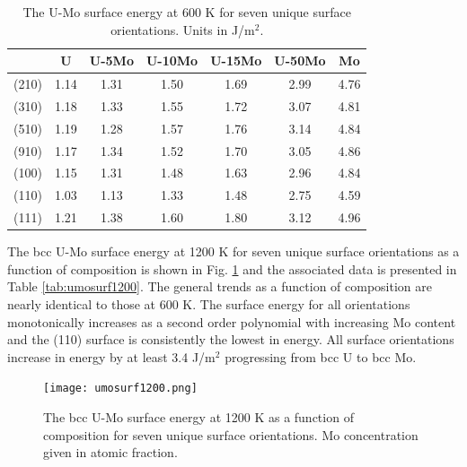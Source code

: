 \documentclass[review]{elsarticle}
\begin{document}
\begin{table}[h]
\caption{The U-Mo surface energy at 600 K for seven unique surface orientations. Units in J/m$^{2}$. } \label{tab:umosurf600}
\begin{center}
\begin{tabular}{|c|c|c|c|c|c|c|}
	\hline
 & U & U-5Mo & U-10Mo & U-15Mo & U-50Mo & Mo \\
\hline
(210) & 1.14 & 1.31 & 1.50 & 1.69 & 2.99 & 4.76 \\
(310)	 & 1.18 & 1.33 & 1.55 & 1.72 & 3.07 & 4.81 \\ 
(510)	 & 1.19 & 1.28 & 1.57 & 1.76 & 3.14 & 4.84 \\
(910)	 & 1.17 & 1.34 & 1.52 & 1.70 & 3.05 & 4.86 \\
(100)	 & 1.15 & 1.31 & 1.48 & 1.63 & 2.96 & 4.84 \\
(110)	 & 1.03 & 1.13 & 1.33 & 1.48 & 2.75 & 4.59 \\
(111)	 & 1.21 & 1.38 & 1.60 & 1.80 & 3.12 & 4.96 \\
 	 \hline
\end{tabular}
\end{center}
\label{default}
\end{table}

\FloatBarrier

The bcc U-Mo surface energy at 1200 K for seven unique surface orientations as a function of composition is shown in Fig. \ref{fig:umosurf1200} and the associated data is presented in Table \ref{tab:umosurf1200}. The general trends as a function of composition are nearly identical to those at 600 K. The surface energy for all orientations monotonically increases as a second order polynomial with increasing Mo content and the (110) surface is consistently the lowest in energy. All surface orientations increase in energy by at least 3.4 J/m$^{2}$ progressing from bcc U to bcc Mo. 

\begin{figure}[h]
 \centering
 \texttt{[image: umosurf1200.png]} 
 \caption{The bcc U-Mo surface energy at 1200 K as a function of composition for seven unique surface orientations. Mo concentration given in atomic fraction.}
 \label{fig:umosurf1200}
\end{figure}
\end{document}

